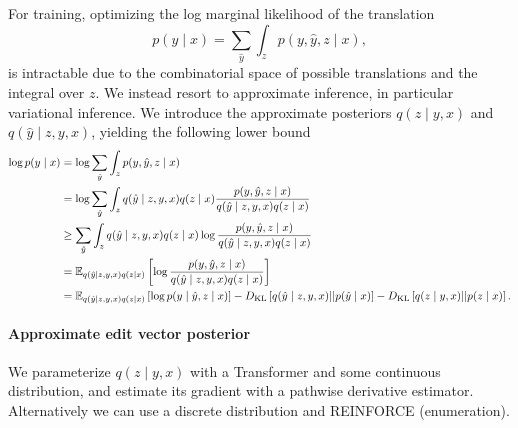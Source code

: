 \documentclass[11pt]{article}
\begin{document}
For training, optimizing the log marginal likelihood of the translation
$$p(y \mid x) = \sum_{\hat{y}}\int_z p(y,\hat{y}, z \mid x),$$
is intractable due to the combinatorial space of possible translations and
the integral over $z$.
We instead resort to approximate inference, in particular variational inference.
We introduce the approximate posteriors $q(z \mid y, x)$ and $q(\hat{y} \mid z, y, x)$,
yielding the following lower bound
$$
\begin{aligned}
\log p(y \mid x) &= \log \sum_{\hat{y}}\int_z p(y,\hat{y}, z \mid x)\\
&= \log \sum_{\hat{y}}\int_z
    q(\hat{y} \mid z, y, x)q(z \mid x)
    \frac{p(y,\hat{y}, z \mid x)}{q(\hat{y} \mid z, y, x)q(z \mid x)}\\
&\ge \sum_{\hat{y}}\int_z
    q(\hat{y} \mid z, y, x)q(z \mid x)
    \log \frac{p(y,\hat{y}, z \mid x)}{q(\hat{y} \mid z, y, x)q(z \mid x)}\\
&= \mathbb{E}_{q(\hat{y} \mid z, y, x)q(z \mid x)}\left[\log \frac{p(y,\hat{y}, z \mid x)}{q(\hat{y} \mid z, y, x)q(z \mid x)}\right]\\
&= \mathbb{E}_{q(\hat{y} \mid z, y, x)q(z \mid x)}\left[\log p(y\mid \hat{y}, z \mid x)\right]
-D_\mathrm{KL}\left[q(\hat{y} \mid z, y, x) || p(\hat{y} \mid x)\right]
-D_\mathrm{KL}\left[q(z \mid y, x) || p(z \mid x)\right].
\end{aligned}
$$

\paragraph{Approximate edit vector posterior}
We parameterize $q(z \mid y, x)$ with a Transformer and some continuous distribution,
and estimate its gradient with a pathwise derivative estimator.
Alternatively we can use a discrete distribution and REINFORCE (enumeration).
\end{document}
